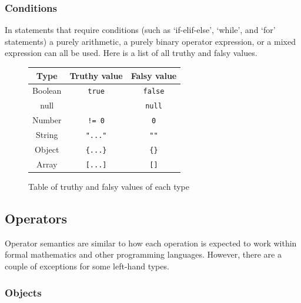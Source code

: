 \documentclass[]{interim}
\theoremstyle{definition}
\begin{document}
\subsubsection{Conditions}

In statements that require conditions (such as `if-elif-else', `while', and `for' statements) a purely arithmetic, a purely binary operator expression, or a mixed expression can all be used. Here is a list of all truthy and falsy values.

\begin{figure}[H]
    \begin{center}
        \begin{tabular}{| c | c | c |}
            \hline
            Type & Truthy value & Falsy value\\
            \hline
            Boolean & \verb|true| & \verb|false|\\
            \hline
            null & & \verb|null|\\
            \hline
            Number & \verb|!= 0| & \verb|0|\\
            \hline
            String & \verb|"..."| & \verb|""|\\
            \hline
            Object & \verb|{...}| & \verb|{}|\\
            \hline
            Array & \verb|[...]| & \verb|[]|\\
            \hline
        \end{tabular}
    \end{center}
    \caption{Table of truthy and falsy values of each type}
\end{figure}

\subsection{Operators}

Operator semantics are similar to how each operation is expected to work within formal mathematics and other programming languages. However, there are a couple of exceptions for some left-hand types.

\subsubsection{Objects}
\label{sec:semantics-operators-objects}
\end{document}
